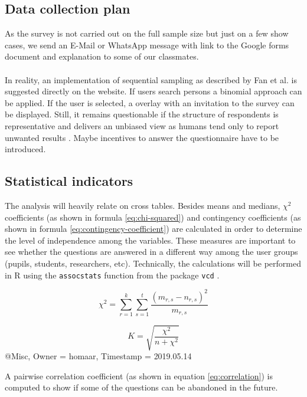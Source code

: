 \documentclass[12pt,a4paper,paper=a4,oneside,titlepage,pdftex]{scrartcl}
\begin{document}
\subsection{Data collection plan}
As the survey is not carried out on the full sample size but just on a few show cases, we send an E-Mail or WhatsApp message with link to the Google forms document and explanation to some of our classmates.
\\ \\
In reality, an implementation of sequential sampling as described by Fan et al. \citep{fan1962development} is suggested directly on the website. If users search persons a binomial approach can be applied. If the user is selected, a overlay with an invitation to the survey can be displayed. Still, it remains questionable if the structure of respondents is representative and delivers an unbiased view as humans tend only to report unwanted results \citep{bergstrand1983bias}. Maybe incentives to answer the questionnaire have to be introduced.

\subsection{Statistical indicators}
The analysis will heavily relate on cross tables. Besides means and medians, $\chi^2$ coefficients \citep{doi:10.1080/14786440009463897} (as shown in formula \ref{eq:chi-squared}) and contingency coefficients \citep{pearson1930theory} (as shown in formula \ref{eq:contingency-coefficient}) are calculated in order to determine the level of independence among the variables. These measures are important to see whether the questions are answered in a different way among the user groups (pupils, students, researchers, etc). Technically, the calculations will be performed in R using the \verb|assocstats| function from the package \verb|vcd| \citep{vcd2006}.

\begin{equation}
\chi^2 = \sum_{r=1}^{k}\sum_{s=1}^{t}\frac{(m_{r,s}-n_{r,s})^2}{m_{r,s}}
\label{eq:chi-squared}
\end{equation}

\begin{equation}
K = \sqrt{\frac{\chi^2}{n+\chi^2}}
\label{eq:contingency-coefficient}
\end{equation}@Misc{,
  Owner                    = {homaar},
  Timestamp                = {2019.05.14}
}


A pairwise correlation coefficient \citep{lee1988thirteen} (as shown in equation \ref{eq:correlation}) is computed to show if some of the questions can be abandoned in the future.
\end{document}
